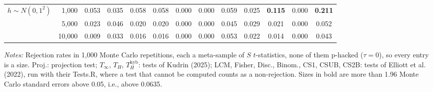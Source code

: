 \begin{table}[htbp]
{\begin{tabular}{lrccccccccccc}
\addlinespace
$h \sim N(0, 1^2)$ & 1,000 & 0.053 & 0.035 & 0.058 & 0.058 & 0.000 & 0.000 & 0.059 & 0.025 & \textbf{0.115} & 0.000 & \textbf{0.211} \\
 & 5,000 & 0.023 & 0.046 & 0.020 & 0.020 & 0.000 & 0.000 & 0.045 & 0.029 & 0.021 & 0.000 & 0.052 \\
 & 10,000 & 0.009 & 0.033 & 0.016 & 0.016 & 0.000 & 0.000 & 0.053 & 0.022 & 0.014 & 0.000 & 0.043 \\
\bottomrule
\end{tabular}%
}%
\usebox{\simtablebox}
\par\smallskip
\begin{minipage}{\wd\simtablebox}\footnotesize\textit{Notes:} Rejection rates in 1,000 Monte Carlo repetitions, each a meta-sample of $S$ $t$-statistics, none of them p-hacked ($\tau = 0$), so every entry is a size. Proj.: projection test; $T_\infty$, $T_H$, $T_H^{\mathrm{hyb}}$: tests of Kudrin (2025); LCM, Fisher, Disc., Binom., CS1, CSUB, CS2B: tests of Elliott et al. (2022), run with their Tests.R, where a test that cannot be computed counts as a non-rejection. Sizes in bold are more than 1.96 Monte Carlo standard errors above 0.05, i.e., above 0.0635.\end{minipage}
\end{table}
